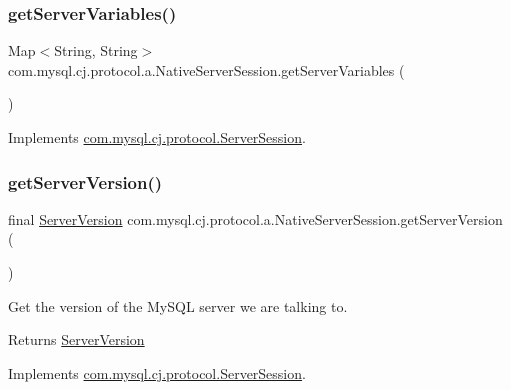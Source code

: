 \subsubsection{\texorpdfstring{get\+Server\+Variables()}{getServerVariables()}}
{\footnotesize\ttfamily Map$<$String, String$>$ com.\+mysql.\+cj.\+protocol.\+a.\+Native\+Server\+Session.\+get\+Server\+Variables (\begin{DoxyParamCaption}{ }\end{DoxyParamCaption})}



Implements \mbox{\hyperlink{interfacecom_1_1mysql_1_1cj_1_1protocol_1_1_server_session_a0bd7485d9c76e0183247def27942a209}{com.\+mysql.\+cj.\+protocol.\+Server\+Session}}.

\mbox{\label{classcom_1_1mysql_1_1cj_1_1protocol_1_1a_1_1_native_server_session_a38d2e0173e10f1f3b55a04c34c9fa8e8}} 
\subsubsection{\texorpdfstring{get\+Server\+Version()}{getServerVersion()}}
{\footnotesize\ttfamily final \mbox{\hyperlink{classcom_1_1mysql_1_1cj_1_1_server_version}{Server\+Version}} com.\+mysql.\+cj.\+protocol.\+a.\+Native\+Server\+Session.\+get\+Server\+Version (\begin{DoxyParamCaption}{ }\end{DoxyParamCaption})}

Get the version of the My\+S\+QL server we are talking to.

\begin{DoxyReturn}{Returns}
\mbox{\hyperlink{classcom_1_1mysql_1_1cj_1_1_server_version}{Server\+Version}} 
\end{DoxyReturn}


Implements \mbox{\hyperlink{interfacecom_1_1mysql_1_1cj_1_1protocol_1_1_server_session_a96ad6ba424e7065b39d9b83dae49834a}{com.\+mysql.\+cj.\+protocol.\+Server\+Session}}.

\mbox{\label{classcom_1_1mysql_1_1cj_1_1protocol_1_1a_1_1_native_server_session_a3b8393e68e3bba53f8afafeb67ea4616}} 
